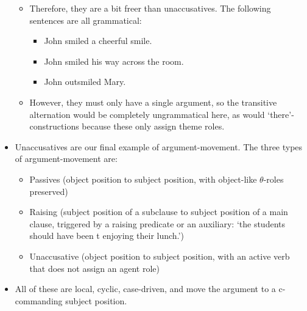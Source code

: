 \documentclass{article}
\begin{document}
\begin{itemize}
\begin{itemize}
        \item Therefore, they are a bit freer than unaccusatives. The following sentences are all grammatical:
        \begin{itemize}
            \item John smiled a cheerful smile.
            \item John smiled his way across the room.
            \item John outsmiled Mary.
        \end{itemize}
        \item However, they must only have a single argument, so the transitive alternation would be completely ungrammatical here, as would `there'-constructions because these only assign theme roles.
    \end{itemize}
    \item Unaccusatives are our final example of argument-movement. The three types of argument-movement are:
    \begin{itemize}
        \item Passives (object position to subject position, with object-like $\theta$-roles preserved)
        \item Raising (subject position of a subclause to subject position of a main clause, triggered by a raising predicate or an auxiliary: `the students should have been t enjoying their lunch.')
        \item Unaccusative (object position to subject position, with an active verb that does not assign an agent role)
    \end{itemize}
    \item All of these are local, cyclic, case-driven, and move the argument to a c-commanding subject position.

\end{itemize}
\end{document}

